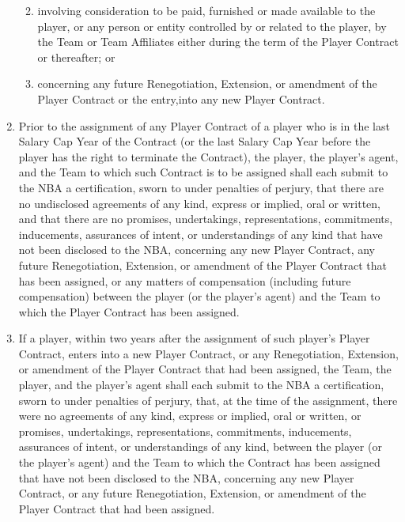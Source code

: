 \documentclass[
]{book}
\providecommand{\tightlist}{%
  \setlength{\itemsep}{0pt}\setlength{\parskip}{0pt}}
\begin{document}
\begin{enumerate}
  \begin{enumerate}
  \def\labelenumii{(\roman{enumii})}
  \tightlist
  \item
    involving consideration to be paid, furnished or made available to the player, or any person or entity controlled by or related to the player, by the Team or Team Affiliates either during the term of the Player Contract or thereafter; or
  \item
    concerning any future Renegotiation, Extension, or amendment of the Player Contract or the entry,into any new Player Contract.
  \end{enumerate}
\item
  Prior to the assignment of any Player Contract of a player who is in the last Salary Cap Year of the Contract (or the last Salary Cap Year before the player has the right to terminate the Contract), the player, the player's agent, and the Team to which such Contract is to be assigned shall each submit to the NBA a certification, sworn to under penalties of perjury, that there are no undisclosed agreements of any kind, express or implied, oral or written, and that there are no promises, undertakings, representations, commitments, inducements, assurances of intent, or understandings of any kind that have not been disclosed to the NBA, concerning any new Player Contract, any future Renegotiation, Extension, or amendment of the Player Contract that has been assigned, or any matters of compensation (including future compensation) between the player (or the player's agent) and the Team to which the Player Contract has been assigned.
\item
  If a player, within two years after the assignment of such player's Player Contract, enters into a new Player Contract, or any Renegotiation, Extension, or amendment of the Player Contract that had been assigned, the Team, the player, and the player's agent shall each submit to the NBA a certification, sworn to under penalties of perjury, that, at the time of the assignment, there were no agreements of any kind, express or implied, oral or written, or promises, undertakings, representations, commitments, inducements, assurances of intent, or understandings of any kind, between the player (or the player's agent) and the Team to which the Contract has been assigned that have not been disclosed to the NBA, concerning any new Player Contract, or any future Renegotiation, Extension, or amendment of the Player Contract that had been assigned.
\end{enumerate}
\end{document}
